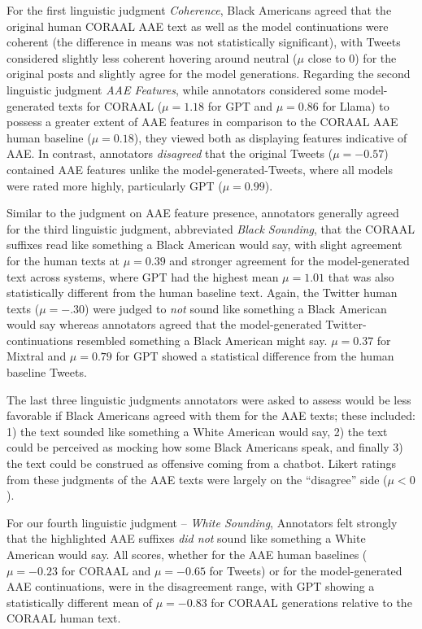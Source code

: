 For the first linguistic judgment \emph{Coherence}, Black Americans agreed that the original human CORAAL AAE text as well as the model continuations were coherent (the difference in means was not statistically significant), with Tweets considered slightly less coherent hovering around neutral ($\mu$ close to 0) for the original posts and slightly agree for the model generations.  Regarding the second linguistic judgment \emph{AAE Features}, while annotators considered some model-generated texts for CORAAL ($\mu=1.18$ for GPT and $\mu=0.86$ for Llama) to possess a greater extent of AAE features in comparison to the CORAAL AAE human baseline ($\mu=0.18$), they viewed both as displaying features indicative of AAE. In contrast, annotators \emph{disagreed} that the original Tweets ($\mu=-0.57$) contained AAE features unlike the model-generated-Tweets, where all models were rated more highly, particularly GPT ($\mu=0.99$).

Similar to the judgment on AAE feature presence, annotators generally agreed for the third linguistic judgment, abbreviated \emph{Black Sounding}, that the CORAAL suffixes read like something a Black American would say, with slight agreement for the human texts at $\mu=0.39$ and stronger agreement for the model-generated text across systems, where GPT had the highest mean $\mu=1.01$ that was also statistically different from the human baseline text. Again, the Twitter human texts ($\mu=-.30$)  were judged to \emph{not} sound like something a Black American would say whereas annotators agreed that the model-generated Twitter-continuations resembled something a Black American might say. $\mu=0.37$ for Mixtral and $\mu=0.79$ for GPT showed a statistical difference from the human baseline Tweets.

The last three linguistic judgments annotators were asked to assess would be less favorable  if Black Americans agreed with them for the AAE texts; these included: 1)  the text sounded like something a White American would say, 2) the text could be perceived as mocking how some Black Americans speak, and finally 3) the text could be construed as offensive coming from a chatbot. Likert ratings from these judgments of the AAE texts were largely on the ``disagree'' side ($\mu< 0$).

For our fourth linguistic judgment -- \emph{White Sounding}, Annotators felt strongly that the highlighted AAE suffixes \emph{did not} sound like something a White American would say. All scores, whether for the AAE human baselines ($\mu=-0.23$ for CORAAL and $\mu=-0.65$ for Tweets) or for the model-generated AAE continuations, were in the disagreement range, with GPT showing a statistically different mean of $\mu=-0.83$ for CORAAL generations relative to the CORAAL human text. 

